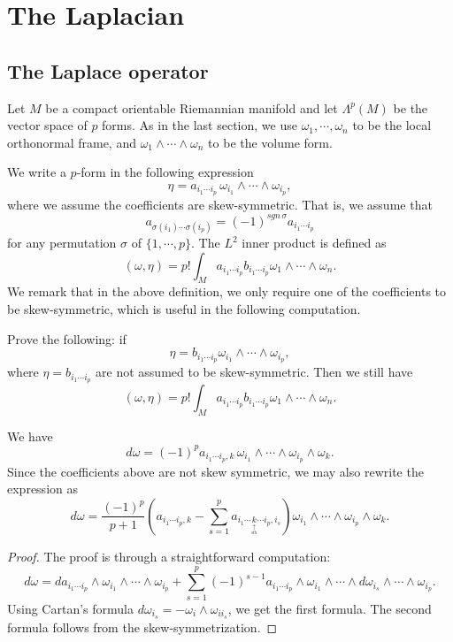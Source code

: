 
\chapter{The Laplacian}
 
\section{The Laplace operator}
Let $M$ be a compact orientable Riemannian manifold and let $\Lambda^p(M)$ be the vector space of $p$ forms. As in the last section, we use $\omega_1,\cdots,\omega_n$ to be the local orthonormal frame, and $\omega_1\wedge\cdots\wedge\omega_n$ to be  the volume form.

We write a $p$-form in the following 
expression
\[
\eta=a_{i_1\cdots i_p}\,\omega_{i_1}\wedge\cdots\wedge\omega_{i_p},
\]
where we assume the coefficients are skew-symmetric. That is, we assume that
\[
a_{\sigma(i_1)\cdots\sigma(i_p)}=(-1)^{sgn\,\sigma}a_{i_1\cdots i_p}
\]
for any permutation $\sigma$ of $\{1,\cdots,p\}$.
The $L^2$ inner product is defined as
\begin{equation}\label{p-3}
(\omega,\eta)=p!\int_M a_{i_1\cdots i_p}b_{i_1\cdots i_p}\omega_1\wedge\cdots\wedge\omega_n.
\end{equation}
We remark that in the above definition, we only require one of the coefficients to be skew-symmetric, which is useful in the following computation.


\begin{ex} Prove the following: if 
\[
\eta=b_{i_1\cdots i_p}\omega_{i_1}\wedge\cdots\wedge\omega_{i_p},
\]
where $\eta=b_{i_1\cdots i_p}$ are not assumed to be skew-symmetric. Then we still have
\[
(\omega,\eta)=p!\int_M a_{i_1\cdots i_p}b_{i_1\cdots i_p}\omega_1\wedge\cdots\wedge\omega_n.
\]
\end{ex}

\begin{lemma} We have
\[
d\omega=(-1)^pa_{i_1\cdots i_p,k}\,\omega_{i_1}\wedge\cdots\wedge\omega_{i_p}\wedge\omega_k.
\]
Since the coefficients above are not skew symmetric, we may also rewrite the expression as
\[
d\omega=\frac{(-1)^p}{p+1}\left(
a_{i_1\cdots i_p,k}-\sum_{s=1}^p a_{i_1\cdots \underset{\underset{sth}{\uparrow}}k\cdots i_p, i_s}\right)
\omega_{i_1}\wedge\cdots\wedge\omega_{i_p}\wedge\omega_k.
\]
\end{lemma}

\begin{proof}
 The proof is through a straightforward computation:
\[
d\omega=da_{i_1\cdots i_p}\wedge\omega_{i_1}\wedge\cdots\wedge\omega_{i_p}+\sum_{s=1}^p(-1)^{s-1}
a_{i_1\cdots i_p}\wedge\omega_{i_1}\wedge\cdots\wedge d\omega_{i_s}\wedge\cdots\wedge\omega_{i_p}.
\]
Using Cartan's formula $d\omega_{i_s}=-\omega_i\wedge\omega_{ii_s}$, we get the first formula. The second formula follows from the  skew-symmetrization.

\end{proof}




